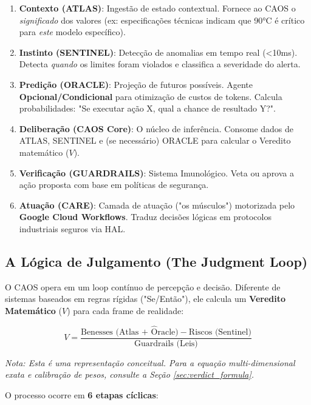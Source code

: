 \documentclass[12pt, a4paper]{article}
\begin{document}
\begin{enumerate}
    \item \textbf{Contexto (ATLAS)}: Ingestão de estado contextual. Fornece ao CAOS o \textit{significado} dos valores (ex: especificações técnicas indicam que 90°C é crítico para \textit{este} modelo específico).
    \item \textbf{Instinto (SENTINEL)}: Detecção de anomalias em tempo real (<10ms). Detecta \textit{quando} os limites foram violados e classifica a severidade do alerta.
    \item \textbf{Predição (ORACLE)}: Projeção de futuros possíveis. Agente \textbf{Opcional/Condicional} para otimização de custos de tokens. Calcula probabilidades: "Se executar ação X, qual a chance de resultado Y?".
    \item \textbf{Deliberação (CAOS Core)}: O núcleo de inferência. Consome dados de ATLAS, SENTINEL e (se necessário) ORACLE para calcular o Veredito matemático ($V$).
    \item \textbf{Verificação (GUARDRAILS)}: Sistema Imunológico. Veta ou aprova a ação proposta com base em políticas de segurança.
    \item \textbf{Atuação (CARE)}: Camada de atuação ("os músculos") motorizada pelo \textbf{Google Cloud Workflows}. Traduz decisões lógicas em protocolos industriais seguros via HAL.
\end{enumerate}

\subsection{A Lógica de Julgamento (The Judgment Loop)}

O CAOS opera em um loop contínuo de percepção e decisão. Diferente de sistemas baseados em regras rígidas ("Se/Então"), ele calcula um \textbf{Veredito Matemático} ($V$) para cada frame de realidade:

\begin{equation}
V = \frac{\text{Benesses (Atlas + } \hat{\text{O}}\text{racle)} - \text{Riscos (Sentinel)}}{\text{Guardrails (Leis)}}
\end{equation}

\noindent \textit{Nota: Esta é uma representação conceitual. Para a equação multi-dimensional exata e calibração de pesos, consulte a Seção \ref{sec:verdict_formula}.}

O processo ocorre em \textbf{6 etapas cíclicas}:
\end{document}
